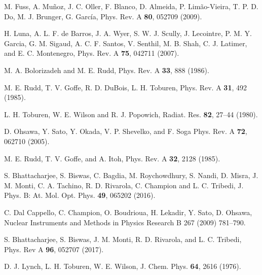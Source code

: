 \begin{thebibliography}{9}
M. Fuss, A. Muñoz, J. C. Oller, F. Blanco, D. Almeida, P. Limão-Vieira, 
T. P. D. Do, M. J. Brunger, G. Garc\'{i}a,
Phys. Rev. A \textbf{80}, 052709 (2009).

H. Luna, A. L. F. de Barros, J. A. Wyer, S. W. J. Scully, J. Lecointre, 
P. M. Y. Garcia, G. M. Sigaud, A. C. F. Santos, V. Senthil, M. B. Shah, 
C. J. Latimer, and E. C. Montenegro,
Phys. Rev. A \textbf{75}, 042711 (2007).

M. A. Bolorizadeh and M. E. Rudd, 
Phys. Rev. A \textbf{33}, 888 (1986). 

M. E. Rudd, T. V. Goffe, R. D. DuBois, L. H. Toburen, 
Phys. Rev. A \textbf{31}, 492 (1985). 

L. H. Toburen, W. E. Wilson and R. J. Popowich,
Radiat. Res. \textbf{82}, 27--44 (1980).

D. Ohsawa, Y. Sato, Y. Okada, V. P. Shevelko, and F. Soga
Phys. Rev. A \textbf{72}, 062710 (2005).

M. E. Rudd, T. V. Goffe, and A. Itoh, 
Phys. Rev. A \textbf{32}, 2128 (1985).


S. Bhattacharjee, S. Biswas, C. Bagdia, M. Roychowdhury, S. Nandi, 
D. Misra, J. M. Monti, C. A. Tachino, R. D. Rivarola, C. Champion and 
L. C. Tribedi, J. 
Phys. B: At. Mol. Opt. Phys. \textbf{49},  065202 (2016).

C. Dal Cappello, C. Champion, O. Boudrioua, H. Lekadir, Y. Sato, 
D. Ohsawa, 
Nuclear Instruments and Methods in Physics Research B 267 (2009) 781--790.

S. Bhattacharjee, S. Biswas, J. M. Monti, R. D. Rivarola, and 
L. C. Tribedi,
Phys. Rev A \textbf{96}, 052707 (2017).

D. J. Lynch, L. H. Toburen, W. E. Wilson,
J. Chem. Phys. \textbf{64}, 2616 (1976).


\end{thebibliography}
